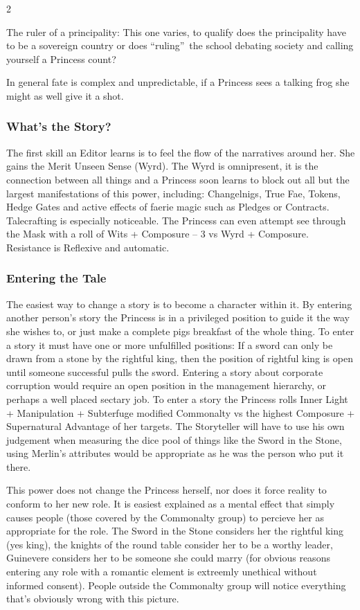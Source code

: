 \begin{multicols}{2}
\begin{mybox}
The ruler of a principality: This one varies, to qualify does the principality have to be a sovereign country or does \textquotedblleft ruling\textquotedblright\, the school debating society and calling yourself a Princess count? 



In general fate is complex and unpredictable, if a Princess sees a talking frog she might as well give it a shot. 

\end{mybox}

\subsubsection*{What's the Story?}
The first skill an Editor learns is to feel the flow of the narratives around her. She gains the Merit Unseen Sense (Wyrd). The Wyrd is omnipresent, it is the connection between all things and a Princess soon learns to block out all but the largest manifestations of this power, including: Changelnigs, True Fae, Tokens, Hedge Gates and active effects of faerie magic such as Pledges or Contracts. Talecrafting is especially noticeable. The Princess can even attempt see through the Mask with a roll of Wits + Composure – 3 vs Wyrd + Composure. Resistance is Reflexive and automatic. 
\subsubsection*{Entering the Tale}
The easiest way to change a story is to become a character within it. By entering another person's story the Princess is in a privileged position to guide it the way she wishes to, or just make a complete pigs breakfast of the whole thing. To enter a story it must have one or more unfulfilled positions: If a sword can only be drawn from a stone by the rightful king, then the position of rightful king is open until someone successful pulls the sword. Entering a story about corporate corruption would require an open position in the management hierarchy, or perhaps a well placed sectary job. To enter a story the Princess rolls Inner Light + Manipulation + Subterfuge modified Commonalty vs the highest Composure + Supernatural Advantage of her targets. The Storyteller will have to use his own judgement when measuring the dice pool of things like the Sword in the Stone, using Merlin's attributes would be appropriate as he was the person who put it there.

This power does not change the Princess herself, nor does it force reality to conform to her new role. It is easiest explained as a mental effect that simply causes people (those covered by the Commonalty group) to percieve her as appropriate for the role. The Sword in the Stone considers her the rightful king (yes king), the knights of the round table consider her to be a worthy leader, Guinevere considers her to be someone she could marry (for obvious reasons entering any role with a romantic element is extreemly unethical without informed consent). People outside the Commonalty group will notice everything that's obviously wrong with this picture. 


\end{multicols}
